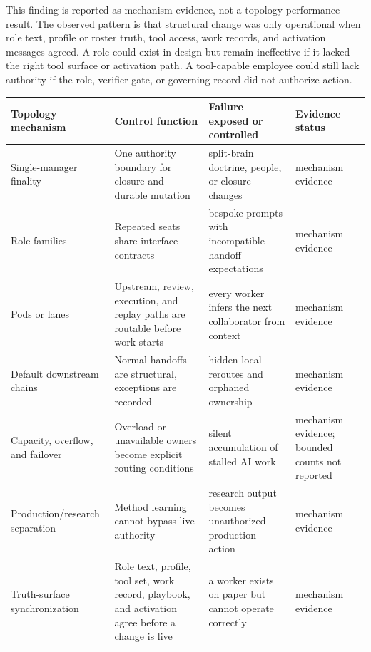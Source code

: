 \documentclass[
]{article}
\newcounter{none} %
\begin{document}
This finding is reported as mechanism evidence, not a topology-performance result. The observed pattern is that structural change was only operational when role text, profile or roster truth, tool access, work records, and activation messages agreed. A role could exist in design but remain ineffective if it lacked the right tool surface or activation path. A tool-capable employee could still lack authority if the role, verifier gate, or governing record did not authorize action.

{\def\LTcaptype{none} %
\begin{longtable}[]{@{}
  >{\raggedright\arraybackslash}p{}
  >{\raggedright\arraybackslash}p{}
  >{\raggedright\arraybackslash}p{}
  >{\raggedright\arraybackslash}p{}@{}}
\toprule\noalign{}
\begin{minipage}[b]{\linewidth}\raggedright
Topology mechanism
\end{minipage} & \begin{minipage}[b]{\linewidth}\raggedright
Control function
\end{minipage} & \begin{minipage}[b]{\linewidth}\raggedright
Failure exposed or controlled
\end{minipage} & \begin{minipage}[b]{\linewidth}\raggedright
Evidence status
\end{minipage} \\
\midrule\noalign{}
\endhead
\bottomrule\noalign{}
\endlastfoot
Single-manager finality & One authority boundary for closure and durable mutation & split-brain doctrine, people, or closure changes & mechanism evidence \\
Role families & Repeated seats share interface contracts & bespoke prompts with incompatible handoff expectations & mechanism evidence \\
Pods or lanes & Upstream, review, execution, and replay paths are routable before work starts & every worker infers the next collaborator from context & mechanism evidence \\
Default downstream chains & Normal handoffs are structural, exceptions are recorded & hidden local reroutes and orphaned ownership & mechanism evidence \\
Capacity, overflow, and failover & Overload or unavailable owners become explicit routing conditions & silent accumulation of stalled AI work & mechanism evidence; bounded counts not reported \\
Production/research separation & Method learning cannot bypass live authority & research output becomes unauthorized production action & mechanism evidence \\
Truth-surface synchronization & Role text, profile, tool set, work record, playbook, and activation agree before a change is live & a worker exists on paper but cannot operate correctly & mechanism evidence \\
\end{longtable}
}
\end{document}
